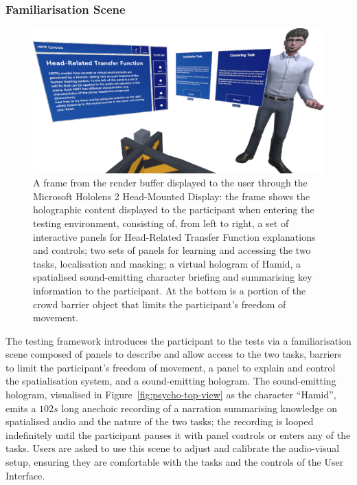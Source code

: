 \subsubsection{Familiarisation Scene}
\begin{figure}[htbp]
    \centering
    \includegraphics[width=1\linewidth]{7_evaluation/images/test_participant_perspective.png}
    \caption{A frame from the render buffer displayed to the user through the Microsoft Hololens 2 Head-Mounted Display: the frame shows the holographic content displayed to the participant when entering the testing environment, consisting of, from left to right, a set of interactive panels for Head-Related Transfer Function explanations and controls; two sets of panels for learning and accessing the two tasks, localisation and masking; a virtual hologram of Hamid, a spatialised sound-emitting character briefing and summarising key information to the participant. At the bottom is a portion of the crowd barrier object that limits the participant's freedom of movement.}
    \label{fig:test-participant-perspective}
\end{figure}
The testing framework introduces the participant to the tests via a familiarisation scene composed of panels to describe and allow access to the two tasks, barriers to limit the participant's freedom of movement, a panel to explain and control the spatialisation system, and a sound-emitting hologram. The sound-emitting hologram, visualised in Figure~\ref{fig:psycho-top-view} as the character ``Hamid'', emits a $102s$ long anechoic recording of a narration summarising knowledge on spatialised audio and the nature of the two tasks; the recording is looped indefinitely until the participant pauses it with panel controls or enters any of the tasks. Users are asked to use this scene to adjust and calibrate the audio-visual setup, ensuring they are comfortable with the tasks and the controls of the User Interface. \par
